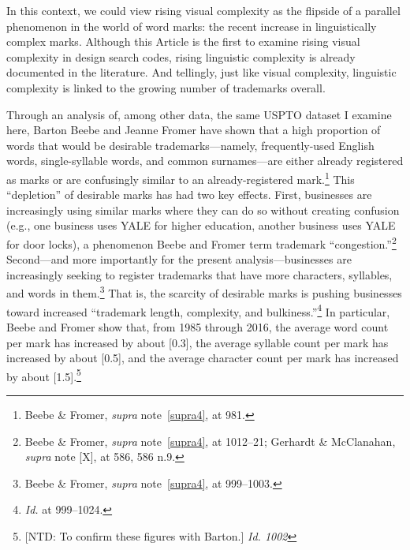 \documentclass[letterpaper, 11pt, oneside]{article}
\begin{document}
In this context, we could view rising visual complexity as the flipside of a parallel phenomenon in the world of word marks: the recent increase in linguistically complex marks. Although this Article is the first to examine rising visual complexity in design search codes, rising linguistic complexity is already documented in the literature. And tellingly, just like visual complexity, linguistic complexity is linked to the growing number of trademarks overall.

Through an analysis of, among other data, the same USPTO dataset I examine here, Barton Beebe and Jeanne Fromer have shown that a high proportion of words that would be desirable trademarks—namely, frequently-used English words, single-syllable words, and common surnames—are either already registered as marks or are confusingly similar to an already-registered mark.\footnote{Beebe \& Fromer, \textit{supra} note~\ref{supra4}, at 981.} This ``depletion'' of desirable marks has had two key effects. First, businesses are increasingly using similar marks where they can do so without creating confusion (e.g., one business uses YALE for higher education, another business uses YALE for door locks), a phenomenon Beebe and Fromer term trademark ``congestion.''\footnote{Beebe \& Fromer, \textit{supra} note~\ref{supra4}, at 1012–21; Gerhardt \& McClanahan, \textit{supra} note [X], at 586, 586 n.9.} Second—and more importantly for the present analysis—businesses are increasingly seeking to register trademarks that have more characters, syllables, and words in them.\footnote{Beebe \& Fromer, \textit{supra} note~\ref{supra4}, at 999–1003.} That is, the scarcity of desirable marks is pushing businesses toward increased ``trademark length, complexity, and bulkiness.''\footnote{\textit{Id.} at 999–1024.}  In particular, Beebe and Fromer show that, from 1985 through 2016, the average word count per mark has increased by about [0.3], the average syllable count per mark has increased by about [0.5], and the average character count per mark has increased by about [1.5].\footnote{[NTD: To confirm these figures with Barton.] \textit{Id. 1002}}
\end{document}

